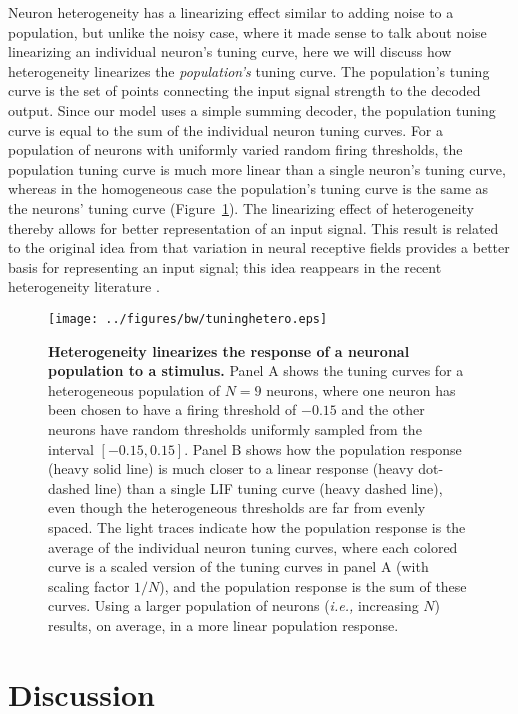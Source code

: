 \documentclass[12pt]{article}
\begin{document}
Neuron heterogeneity has a linearizing effect similar to adding noise to a population, but unlike the noisy case, where it made sense to talk about noise linearizing an individual neuron's tuning curve, here we will discuss how heterogeneity linearizes the \emph{population's} tuning curve. The population's tuning curve is the set of points connecting the input signal strength to the decoded output. Since our model uses a simple summing decoder, the population tuning curve is equal to the sum of the individual neuron tuning curves. For a population of neurons with uniformly varied random firing thresholds, the population tuning curve is much more linear than a single neuron's tuning curve, whereas in the homogeneous case the population's tuning curve is the same as the neurons' tuning curve (Figure~\ref{fig:tuninghetero}). The linearizing effect of heterogeneity thereby allows for better representation of an input signal. This result is related to the original idea from \cite{Hubel1962} that variation in neural receptive fields provides a better basis for representing an input signal; this idea reappears in the recent heterogeneity literature \citep{Angelo2012}.

\begin{figure}
  \ifx\hidefigures\undefined
    \centering
    \texttt{[image: ../figures/bw/tuninghetero.eps]}
  \fi
  \caption{
    \textbf{Heterogeneity linearizes the response of a neuronal population to a stimulus.} Panel A shows the tuning curves for a heterogeneous population of $N = 9$ neurons, where one neuron has been chosen to have a firing threshold of $-0.15$ and the other neurons have random thresholds uniformly sampled from the interval $[-0.15,0.15]$. Panel B shows how the population response (heavy solid line) is much closer to a linear response (heavy dot-dashed line) than a single LIF tuning curve (heavy dashed line), even though the heterogeneous thresholds are far from evenly spaced. The light traces indicate how the population response is the average of the individual neuron tuning curves, where each colored curve is a scaled version of the tuning curves in panel A (with scaling factor $1/N$), and the population response is the sum of these curves. Using a larger population of neurons (\emph{i.e.,} increasing $N$) results, on average, in a more linear population response.
  }
  \label{fig:tuninghetero}
\end{figure}


\section{Discussion}
\label{scn:discussion}
\end{document}
